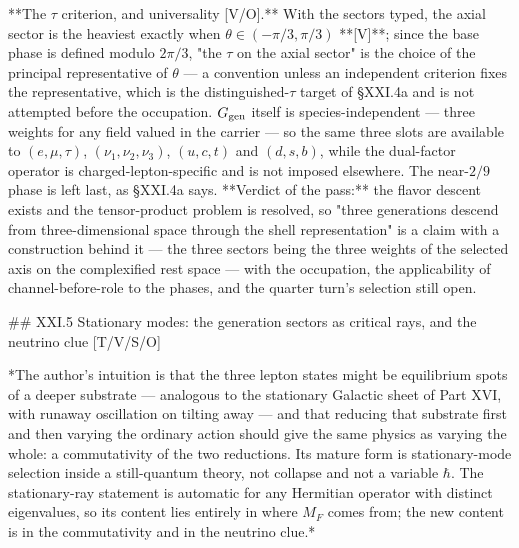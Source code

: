**The $\tau$ criterion, and universality [V/O].** With the sectors typed, the axial sector is the heaviest exactly when $\theta\in(-\pi/3,\pi/3)$ **[V]**; since the base phase is defined modulo $2\pi/3$, "the $\tau$ on the axial sector" is the choice of the principal representative of $\theta$ — a convention unless an independent criterion fixes the representative, which is the distinguished-$\tau$ target of §XXI.4a and is not attempted before the occupation. $G_{\rm gen}$ itself is species-independent — three weights for any field valued in the carrier — so the same three slots are available to $(e,\mu,\tau)$, $(\nu_1,\nu_2,\nu_3)$, $(u,c,t)$ and $(d,s,b)$, while the dual-factor operator is charged-lepton-specific and is not imposed elsewhere. The near-$2/9$ phase is left last, as §XXI.4a says. **Verdict of the pass:** the flavor descent exists and the tensor-product problem is resolved, so "three generations descend from three-dimensional space through the shell representation" is a claim with a construction behind it — the three sectors being the three weights of the selected axis on the complexified rest space — with the occupation, the applicability of channel-before-role to the phases, and the quarter turn's selection still open.

## XXI.5 Stationary modes: the generation sectors as critical rays, and the neutrino clue [T/V/S/O]

*The author's intuition is that the three lepton states might be equilibrium spots of a deeper substrate — analogous to the stationary Galactic sheet of Part XVI, with runaway oscillation on tilting away — and that reducing that substrate first and then varying the ordinary action should give the same physics as varying the whole: a commutativity of the two reductions. Its mature form is stationary-mode selection inside a still-quantum theory, not collapse and not a variable $\hbar$. The stationary-ray statement is automatic for any Hermitian operator with distinct eigenvalues, so its content lies entirely in where $M_F$ comes from; the new content is in the commutativity and in the neutrino clue.*


